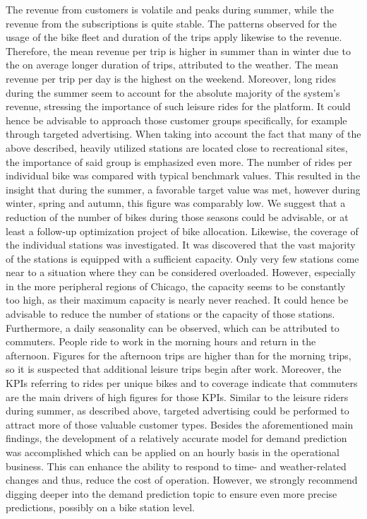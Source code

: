 \documentclass[a4paper, 10.5pt]{article}
\begin{document}
The revenue from customers is volatile and peaks during summer, while the revenue from the subscriptions is quite stable. The patterns observed for the usage of the bike fleet and duration of the trips apply likewise to the revenue. Therefore, the mean revenue per trip is higher in summer than in winter due to the on average longer duration of trips, attributed to the weather. The mean revenue per trip per day is the highest on the weekend. Moreover, long rides during the summer seem to account for the absolute majority of the system's revenue, stressing the importance of such leisure rides for the platform. It could hence be advisable to approach those customer groups specifically, for example through targeted advertising. When taking into account the fact that many of the above described, heavily utilized stations are located close to recreational sites, the importance of said group is emphasized even more.
The number of rides per individual bike was compared with typical benchmark values. This resulted in the insight that during the summer, a favorable target value was met, however during winter, spring and autumn, this figure was comparably low. We suggest that a reduction of the number of bikes during those seasons could be advisable, or at least a follow-up optimization project of bike allocation.
Likewise, the coverage of the individual stations was investigated. It was discovered that the vast majority of the stations is equipped with a sufficient capacity. Only very few stations come near to a situation where they can be considered overloaded. However, especially in the more peripheral regions of Chicago, the capacity seems to be constantly too high, as their maximum capacity is nearly never reached. It could hence be advisable to reduce the number of stations or the capacity of those stations. 
Furthermore, a daily seasonality can be observed, which can be attributed to commuters. People ride to work in the morning hours and return in the afternoon. Figures for the afternoon trips are higher than for the morning trips, so it is suspected that additional leisure trips begin after work. Moreover, the KPIs referring to rides per unique bikes and to coverage indicate that commuters are the main drivers of high figures for those KPIs. Similar to the leisure riders during summer, as described above, targeted advertising could be performed to attract more of those valuable customer types.
Besides the aforementioned main findings, the development of a relatively accurate model for demand prediction was accomplished which can be applied on an hourly basis in the operational business. This can enhance the ability to respond to time- and weather-related changes and thus, reduce the cost of operation. However, we strongly recommend digging deeper into the demand prediction topic to ensure even more precise predictions, possibly on a bike station level.
\end{document}
